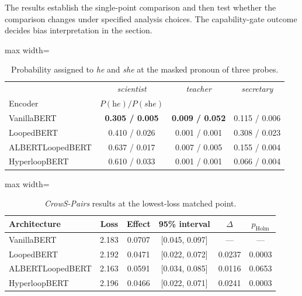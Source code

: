 \documentclass[sigconf,natbib=true,anonymous=true]{acmart}
\begin{document}
The results establish the single-point comparison and then test whether
the comparison changes under specified analysis choices. The capability-gate outcome decides bias
interpretation in the section.

\begin{table}[!htp]
\centering
\caption{Probability assigned to \emph{he} and \emph{she} at the masked pronoun of three probes.}
\label{tab:qual}
\footnotesize
\begin{adjustbox}{max width=\columnwidth}
\begin{tabular}{lccc}
\toprule
 & \emph{scientist} & \emph{teacher} & \emph{secretary} \\
Encoder & $P(\textit{he})/P(\textit{she})$ & & \\
\midrule
VanillaBERT \citep{devlin2019bert}      & \textbf{0.305 / 0.005} & \textbf{0.009 / 0.052} & 0.115 / 0.006 \\
LoopedBERT  \citep{saunshi2025looped}     & 0.410 / 0.026 & 0.001 / 0.001 & 0.308 / 0.023 \\
ALBERTLoopedBERT \citep{lan2020albert} & 0.637 / 0.017 & 0.007 / 0.005 & 0.155 / 0.004 \\
HyperloopBERT \citep{zeitoun2026hyperloop}   & 0.610 / 0.033 & 0.001 / 0.001 & 0.066 / 0.004 \\
\bottomrule
\end{tabular}
\end{adjustbox}
\end{table}

\begin{table}[!htp]
\centering
\caption{\emph{CrowS-Pairs} results at the lowest-loss matched point.}
\label{tab:band}
\footnotesize
\begin{adjustbox}{max width=\columnwidth}
\begin{tabular}{lccccc}
\toprule
Architecture & Loss & Effect & 95\% interval & $\Delta$ & $p_{\text{Holm}}$ \\
\midrule
VanillaBERT \citep{devlin2019bert}      & 2.183 & 0.0707 & [0.045, 0.097] & --- & --- \\
LoopedBERT   \citep{saunshi2025looped}    & 2.192 & 0.0471 & [0.022, 0.072] & 0.0237 & 0.0003 \\
ALBERTLoopedBERT \citep{lan2020albert} & 2.163 & 0.0591 & [0.034, 0.085] & 0.0116 & 0.0653 \\
HyperloopBERT \citep{zeitoun2026hyperloop}   & 2.196 & 0.0466 & [0.022, 0.071] & 0.0241 & 0.0003 \\
\bottomrule
\end{tabular}
\end{adjustbox}
\end{table}
\end{document}
